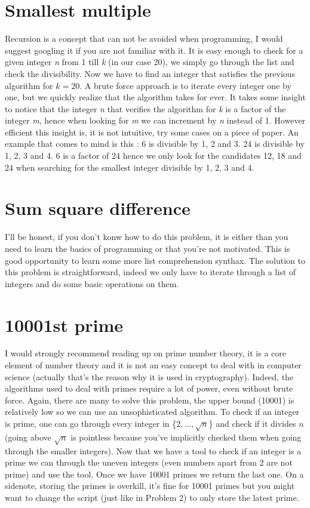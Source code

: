 \documentclass[11pt]{article}
\begin{document}
\section{Smallest multiple}
Recursion is a concept that can not be avoided when programming, I would suggest googling it if you are not familiar with it. It is easy enough to check for a given integer \emph{n} from 1 till \emph{k} (in our case 20), we simply go through the list and check the divisibility. Now we have to find an integer that satisfies the previous algorithm for $k = 20$. A brute force approach is to iterate every integer one by one, but we quickly realize that the algorithm takes for ever. It takes some insight to notice that the integer \emph{n} that verifies the algorithm for \emph{k} is a factor of the integer \emph{m}, hence when looking for \emph{m} we can increment by \emph{n} instead of 1. However efficient this insight is, it is not intuitive, try some cases on a piece of paper. An example that comes to mind is this : 6 is divisible by 1, 2 and 3. 24 is divisible by 1, 2, 3 and 4. 6 is a factor of 24 hence we only look for the candidates 12, 18 and 24 when searching for the smallest integer divisible by 1, 2, 3 and 4.

\section{Sum square difference}
I'll be honest, if you don't konw how to do this problem, it is either than you need to learn the basics of programming or that you're not motivated. This is good opportunity to learn some more list comprehension synthax. The solution to this problem is straightforward, indeed we only have to iterate through a list of integers and do some basic operations on them. 

\section{10001st prime}
I would strongly recommend reading up on prime number theory, it is a core element of number theory and it is not an easy concept to deal with in computer science (actually that's the reason why it is used in cryptography). Indeed, the algorithms used to deal with primes require a lot of power, even without brute force. Again, there are many to solve this problem, the upper bound (10001) is relatively low so we can use an unsophisticated algorithm. To check if an integer is prime, one can go through every integer in \{$2,\dots, \sqrt{n}$\} and check if it divides $n$ (going above $\sqrt{n}$ is pointless because you've implicitly checked them when going through the smaller integers). Now that we have a tool to check if an integer is a prime we can through the uneven integers (even numbers apart from 2 are not prime) and use the tool. Once we have 10001 primes we return the last one. On a sidenote, storing the primes is overkill, it's fine for 10001 primes but you might want to change the script (just like in Problem 2) to only store the latest prime.
\end{document}
